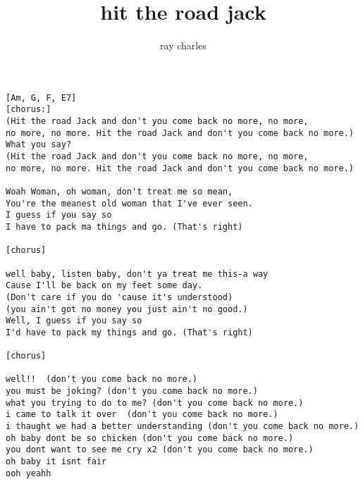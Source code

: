 \author{ray charles}
\title{hit the road jack}
\maketitle
\begin{verbatim}
[Am, G, F, E7]
[chorus:]
(Hit the road Jack and don't you come back no more, no more,
no more, no more. Hit the road Jack and don't you come back no more.)
What you say?
(Hit the road Jack and don't you come back no more, no more,
no more, no more. Hit the road Jack and don't you come back no more.)

Woah Woman, oh woman, don't treat me so mean,
You're the meanest old woman that I've ever seen.
I guess if you say so
I have to pack ma things and go. (That's right)

[chorus]

well baby, listen baby, don't ya treat me this-a way
Cause I'll be back on my feet some day.
(Don't care if you do 'cause it's understood)
(you ain't got no money you just ain't no good.)
Well, I guess if you say so
I'd have to pack my things and go. (That's right)

[chorus]

well!!  (don't you come back no more.)
you must be joking? (don't you come back no more.)
what you trying to do to me? (don't you come back no more.)
i came to talk it over  (don't you come back no more.)
i thaught we had a better understanding (don't you come back no more.)
oh baby dont be so chicken (don't you come back no more.)
you dont want to see me cry x2 (don't you come back no more.)
oh baby it isnt fair 
ooh yeahh
\end{verbatim}